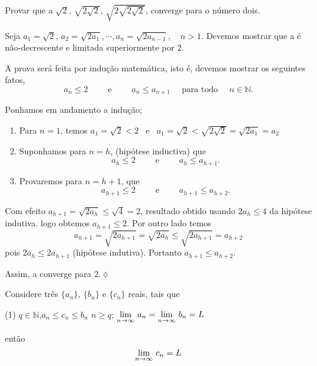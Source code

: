 \begin{exer}
Provar que a \seq $\sqrt{2}$, $\sqrt{2\sqrt{2}}$,
$\sqrt{2\sqrt{2\sqrt{2}}}$, converge para o n\'{u}mero dois.
\end{exer}

\solo Seja $a_1=\sqrt{2}$, $a_2=\sqrt{2a_1},\cdots,
a_n=\sqrt{2a_{n-1}},\quad n>1$. Devemos mostrar que a \seq
{} \'{e} n\~{a}o-decrescente e limitada superiormente por $2$.

A prova ser\'{a} feita por indu\c{c}\~{a}o matem\'{a}tica, isto \'{e}, devemos mostrar os seguintes fatos,
\begin{equation*}
  a_n\leq 2\qquad\text{ e }\qquad  a_n\leq a_{n+1}\quad\text{ para todo }\quad   n\in \mathbb{N}.
\end{equation*}

Ponhamos em andamento a indu\c{c}\~{a}o;
\begin{enumerate}[label=(\roman*),leftmargin=3em]
  \item Para $n=1$, temos $a_1=\sqrt{2}<2$ \ e \ $a_1=\sqrt{2}<\sqrt{2\sqrt{2}}=\sqrt{2a_1}= a_2$
  \item Suponhamos para $n=h$, (hip\'{o}tese inductiva) que
  $$
  a_h\leq 2\qquad  \text{ e } \qquad  a_h\leq a_{h+1}.
  $$
  \item  Provaremos para $n=h+1$, que
\begin{equation*}
    a_{h+1}\leq 2\qquad \text{ e }\qquad  a_{h+1}\leq a_{h+2}.
\end{equation*}
\end{enumerate}
Com efeito $a_{h+1}=\sqrt{2a_h}\leq  \sqrt{4}=2$, resultado obtido usando
$2a_h\leq 4$ da hip\'{o}tese indutiva.
logo obtemos $a_{h+1}\leq 2$. Por outro lado temos
\begin{equation*}
 a_{h+1}=\sqrt{2a_{h+1}}=\sqrt{2a_h}\leq \sqrt{2a_{h+1}}=a_{h+2}
\end{equation*}
pois $2a_h\leq 2a_{h+1}$ (hip\'{o}tese indutiva). Portanto  $a_{h+1}\leq a_{h+2}$.

Assim, a \seq converge para 2.\hfill \(\lozenge\)

\begin{fteo}
Considere tr\^{e}s \seqs $\{a_n\}$, $\{b_n\}$ e $\{c_n\}$ reais, tais que
\begin{tasks}[label=\rm{(\alph*)},item-indent=5em,label-width=4ex,ref=(\alph*)](1)
 \task {}\quad \(q\in \mathbb{N}\),\quad  \(a_n\leq c_n\leq b_n\) 
 \quad{}\quad \(n\geq q\);
 \task \(\displaystyle{\lim_{n\to \infty}\,{a}_{n}}=\displaystyle{\lim_{n\to \infty}\,{b}_{n}}=L\)
\end{tasks}
ent\~{a}o
\begin{equation*}
\displaystyle{\lim_{n\to \infty}\,{c}_{n}}=L
\end{equation*}
\end{fteo}

